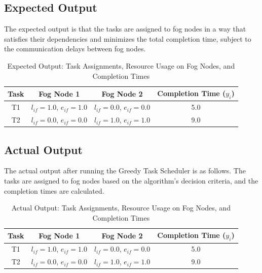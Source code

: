 \documentclass{article}
\begin{document}
\subsection{Expected Output}

The expected output is that the tasks are assigned to fog nodes in a way that satisfies their dependencies and minimizes the total completion time, subject to the communication delays between fog nodes.

\begin{table}[h!]
    \centering
    \begin{tabular}{|c|c|c|c|}
        \hline
        Task  & Fog Node 1 & Fog Node 2 & Completion Time (\(y_i\)) \\
        \hline
        T1    & \( l_{if} = 1.0 \), \( e_{if} = 1.0 \) & \( l_{if} = 0.0 \), \( e_{if} = 0.0 \) & 5.0  \\
        T2    & \( l_{if} = 0.0 \), \( e_{if} = 0.0 \) & \( l_{if} = 1.0 \), \( e_{if} = 1.0 \) & 9.0  \\
        \hline
    \end{tabular}
    \caption{Expected Output: Task Assignments, Resource Usage on Fog Nodes, and Completion Times}
\end{table}

\subsection{Actual Output}

The actual output after running the Greedy Task Scheduler is as follows. The tasks are assigned to fog nodes based on the algorithm's decision criteria, and the completion times are calculated.

\begin{table}[h!]
    \centering
    \begin{tabular}{|c|c|c|c|}
        \hline
        Task  & Fog Node 1 & Fog Node 2 & Completion Time (\(y_i\)) \\
        \hline
        T1    & \( l_{if} = 1.0 \), \( e_{if} = 1.0 \) & \( l_{if} = 0.0 \), \( e_{if} = 0.0 \) & 5.0  \\
        T2    & \( l_{if} = 0.0 \), \( e_{if} = 0.0 \) & \( l_{if} = 1.0 \), \( e_{if} = 1.0 \) & 9.0  \\
        \hline
    \end{tabular}
    \caption{Actual Output: Task Assignments, Resource Usage on Fog Nodes, and Completion Times}
\end{table}
\end{document}
